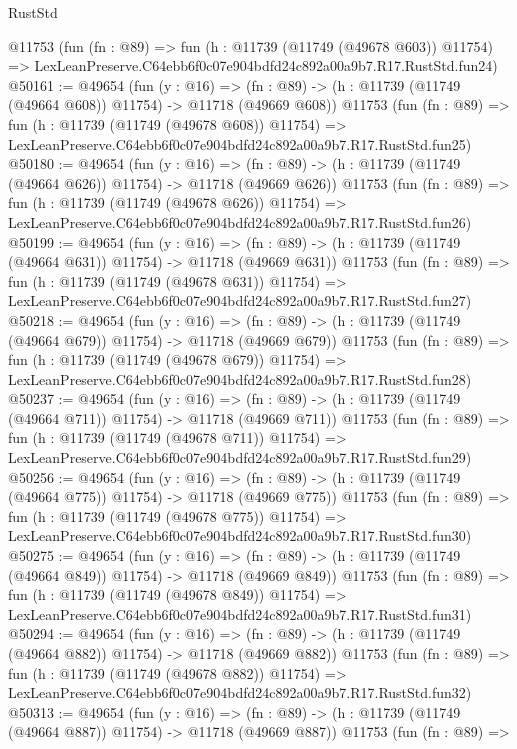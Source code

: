 \begin{lexlean}{RustStd}
\begin{coremodule}
    @11753
    (fun (fn : @89) =>
    fun (h : @11739 (@11749 (@49678 @603)) @11754) =>
    LexLeanPreserve.C64ebb6f0c07e904bdfd24c892a00a9b7.R17.RustStd.fun24)
@50161 := @49654
    (fun (y : @16) =>
    (fn : @89) -> (h : @11739 (@11749 (@49664 @608)) @11754) -> @11718 (@49669 @608))
    @11753
    (fun (fn : @89) =>
    fun (h : @11739 (@11749 (@49678 @608)) @11754) =>
    LexLeanPreserve.C64ebb6f0c07e904bdfd24c892a00a9b7.R17.RustStd.fun25)
@50180 := @49654
    (fun (y : @16) =>
    (fn : @89) -> (h : @11739 (@11749 (@49664 @626)) @11754) -> @11718 (@49669 @626))
    @11753
    (fun (fn : @89) =>
    fun (h : @11739 (@11749 (@49678 @626)) @11754) =>
    LexLeanPreserve.C64ebb6f0c07e904bdfd24c892a00a9b7.R17.RustStd.fun26)
@50199 := @49654
    (fun (y : @16) =>
    (fn : @89) -> (h : @11739 (@11749 (@49664 @631)) @11754) -> @11718 (@49669 @631))
    @11753
    (fun (fn : @89) =>
    fun (h : @11739 (@11749 (@49678 @631)) @11754) =>
    LexLeanPreserve.C64ebb6f0c07e904bdfd24c892a00a9b7.R17.RustStd.fun27)
@50218 := @49654
    (fun (y : @16) =>
    (fn : @89) -> (h : @11739 (@11749 (@49664 @679)) @11754) -> @11718 (@49669 @679))
    @11753
    (fun (fn : @89) =>
    fun (h : @11739 (@11749 (@49678 @679)) @11754) =>
    LexLeanPreserve.C64ebb6f0c07e904bdfd24c892a00a9b7.R17.RustStd.fun28)
@50237 := @49654
    (fun (y : @16) =>
    (fn : @89) -> (h : @11739 (@11749 (@49664 @711)) @11754) -> @11718 (@49669 @711))
    @11753
    (fun (fn : @89) =>
    fun (h : @11739 (@11749 (@49678 @711)) @11754) =>
    LexLeanPreserve.C64ebb6f0c07e904bdfd24c892a00a9b7.R17.RustStd.fun29)
@50256 := @49654
    (fun (y : @16) =>
    (fn : @89) -> (h : @11739 (@11749 (@49664 @775)) @11754) -> @11718 (@49669 @775))
    @11753
    (fun (fn : @89) =>
    fun (h : @11739 (@11749 (@49678 @775)) @11754) =>
    LexLeanPreserve.C64ebb6f0c07e904bdfd24c892a00a9b7.R17.RustStd.fun30)
@50275 := @49654
    (fun (y : @16) =>
    (fn : @89) -> (h : @11739 (@11749 (@49664 @849)) @11754) -> @11718 (@49669 @849))
    @11753
    (fun (fn : @89) =>
    fun (h : @11739 (@11749 (@49678 @849)) @11754) =>
    LexLeanPreserve.C64ebb6f0c07e904bdfd24c892a00a9b7.R17.RustStd.fun31)
@50294 := @49654
    (fun (y : @16) =>
    (fn : @89) -> (h : @11739 (@11749 (@49664 @882)) @11754) -> @11718 (@49669 @882))
    @11753
    (fun (fn : @89) =>
    fun (h : @11739 (@11749 (@49678 @882)) @11754) =>
    LexLeanPreserve.C64ebb6f0c07e904bdfd24c892a00a9b7.R17.RustStd.fun32)
@50313 := @49654
    (fun (y : @16) =>
    (fn : @89) -> (h : @11739 (@11749 (@49664 @887)) @11754) -> @11718 (@49669 @887))
    @11753
    (fun (fn : @89) =>

\end{coremodule}
\end{lexlean}
